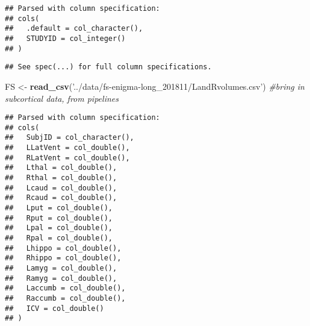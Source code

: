 \documentclass[]{article}
\newenvironment{Shaded}{\begin{snugshade}}{\end{snugshade}}
\newcommand{\KeywordTok}[1]{\textcolor[rgb]{0.13,0.29,0.53}{\textbf{#1}}}
\newcommand{\StringTok}[1]{\textcolor[rgb]{0.31,0.60,0.02}{#1}}
\newcommand{\CommentTok}[1]{\textcolor[rgb]{0.56,0.35,0.01}{\textit{#1}}}
\newcommand{\NormalTok}[1]{#1}
\theoremstyle{definition}
\theoremstyle{definition}
\theoremstyle{definition}
\theoremstyle{remark}
\begin{document}
\begin{verbatim}
## Parsed with column specification:
## cols(
##   .default = col_character(),
##   STUDYID = col_integer()
## )
\end{verbatim}

\begin{verbatim}
## See spec(...) for full column specifications.
\end{verbatim}

\begin{Shaded}
\begin{Highlighting}[]
\NormalTok{FS <-}\StringTok{ }\KeywordTok{read_csv}\NormalTok{(}\StringTok{'../data/fs-enigma-long_201811/LandRvolumes.csv'}\NormalTok{) }\CommentTok{#bring in subcortical data, from pipelines}
\end{Highlighting}
\end{Shaded}

\begin{verbatim}
## Parsed with column specification:
## cols(
##   SubjID = col_character(),
##   LLatVent = col_double(),
##   RLatVent = col_double(),
##   Lthal = col_double(),
##   Rthal = col_double(),
##   Lcaud = col_double(),
##   Rcaud = col_double(),
##   Lput = col_double(),
##   Rput = col_double(),
##   Lpal = col_double(),
##   Rpal = col_double(),
##   Lhippo = col_double(),
##   Rhippo = col_double(),
##   Lamyg = col_double(),
##   Ramyg = col_double(),
##   Laccumb = col_double(),
##   Raccumb = col_double(),
##   ICV = col_double()
## )
\end{verbatim}

\begin{Shaded}
\end{Shaded}
\end{document}
